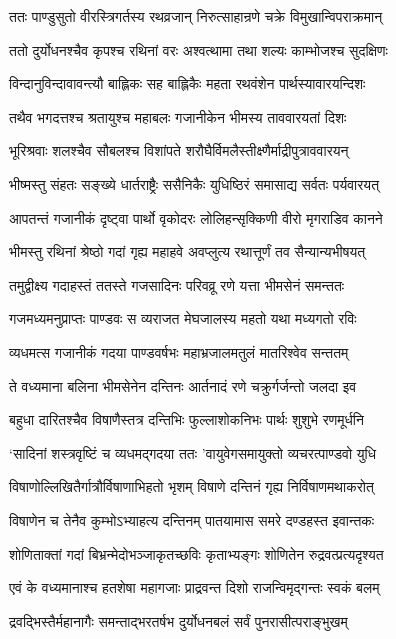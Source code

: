 \twolineshloka
{ततः पाण्डुसुतो वीरस्त्रिगर्तस्य रथव्रजान्}
{निरुत्साहान्रणे चक्रे विमुखान्विपराक्रमान्}


\twolineshloka
{ततो दुर्योधनश्चैव कृपश्च रथिनां वरः}
{अश्वत्थामा तथा शल्यः काम्भोजश्च सुदक्षिणः}


\twolineshloka
{विन्दानुविन्दावावन्त्यौ बाह्लिकः सह बाह्लिकैः}
{महता रथवंशेन पार्थस्यावारयन्दिशः}


\twolineshloka
{तथैव भगदत्तश्च श्रतायुश्च महाबलः}
{गजानीकेन भीमस्य ताववारयतां दिशः}


\twolineshloka
{भूरिश्रवाः शलश्चैव सौबलश्च विशांपते}
{शरौघैर्विमलैस्तीक्ष्णैर्माद्रीपुत्राववारयन्}


\twolineshloka
{भीष्मस्तु संहतः सङ्ख्ये धार्तराष्ट्रैः ससैनिकैः}
{युधिष्ठिरं समासाद्य सर्वतः पर्यवारयत्}


\twolineshloka
{आपतन्तं गजानीकं दृष्ट्वा पार्थो वृकोदरः}
{लोलिहन्सृक्किणी वीरो मृगराडिव कानने}


\twolineshloka
{भीमस्तु रथिनां श्रेष्ठो गदां गृह्य महाहवे}
{अवप्लुत्य रथात्तूर्णं तव सैन्यान्यभीषयत्}


\twolineshloka
{तमुद्वीक्ष्य गदाहस्तं ततस्ते गजसादिनः}
{परिवव्रू रणे यत्ता भीमसेनं समन्ततः}


\twolineshloka
{गजमध्यमनुप्राप्तः पाण्डवः स व्यराजत}
{मेघजालस्य महतो यथा मध्यगतो रविः}


\twolineshloka
{व्यधमत्स गजानीकं गदया पाण्डवर्षभः}
{महाभ्रजालमतुलं मातरिश्वेव सन्ततम्}


\twolineshloka
{ते वध्यमाना बलिना भीमसेनेन दन्तिनः}
{आर्तनादं रणे चक्रुर्गर्जन्तो जलदा इव}


\twolineshloka
{बहुधा दारितश्चैव विषाणैस्तत्र दन्तिभिः}
{फुल्लाशोकनिभः पार्थः शुशुभे रणमूर्धनि}


\twolineshloka
{`सादिनां शस्त्रवृष्टिं च व्यधमद्गदया ततः}
{'वायुवेगसमायुक्तो व्यचरत्पाण्डवो युधि}


\twolineshloka
{विषाणोल्लिखितैर्गात्रौर्विषाणाभिहतो भृशम्}
{विषाणे दन्तिनं गृह्य निर्विषाणमथाकरोत्}


\twolineshloka
{विषाणेन च तेनैव कुम्भोऽभ्याहत्य दन्तिनम्}
{पातयामास समरे दण्डहस्त इवान्तकः}


\twolineshloka
{शोणिताक्तां गदां बिभ्रन्मेदोभञ्जाकृतच्छविः}
{कृताभ्यङ्गः शोणितेन रुद्रवत्प्रत्यदृश्यत}


\twolineshloka
{एवं के वध्यमानाश्च हतशेषा महागजाः}
{प्राद्रवन्त दिशो राजन्विमृद्गन्तः स्वकं बलम्}


\twolineshloka
{द्रवद्भिस्तैर्महानागैः समन्ताद्भरतर्षभ}
{दुर्योधनबलं सर्वं पुनरासीत्पराङ्भुखम्}


